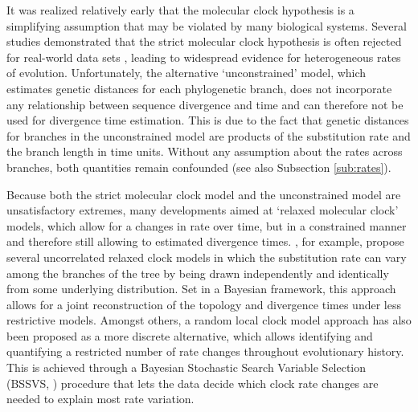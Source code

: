 It was realized relatively early that the molecular clock hypothesis is a simplifying assumption that may be violated by many biological systems.
Several studies demonstrated that the strict molecular clock hypothesis is often rejected for real-world data sets \citep{EyreWalker1997,Andreasen2001}, leading to widespread evidence for heterogeneous rates of evolution.
Unfortunately, the alternative `unconstrained' model, which estimates genetic distances for each phylogenetic branch, does not incorporate any relationship between sequence divergence and time and can therefore not be used for divergence time estimation.
This is due to the fact that genetic distances for branches in the unconstrained model are products of the substitution rate and the branch length in time units.
Without any assumption about the rates across branches, both quantities remain confounded (see also Subsection \ref{sub:rates}).

Because both the strict molecular clock model and the unconstrained model are unsatisfactory extremes, many developments aimed at `relaxed molecular clock' models, which allow for a changes in rate over time, but in a constrained manner and therefore still allowing to estimated divergence times.
\citet{Drummond2006}, for example, propose several uncorrelated relaxed clock models in which the substitution rate can vary among the branches of the tree by being drawn independently and identically from some underlying distribution.
Set in a Bayesian framework, this approach allows for a joint reconstruction of the topology and divergence times under less restrictive models.
Amongst others, a random local clock model approach has also been proposed \citet{Drummond2010} as a more discrete alternative, which allows identifying and quantifying a restricted number of rate changes throughout evolutionary history.
This is achieved through a Bayesian Stochastic Search Variable Selection (BSSVS, \citet{Lemey2009}) procedure that lets the data decide which clock rate changes are needed to explain most rate variation.

